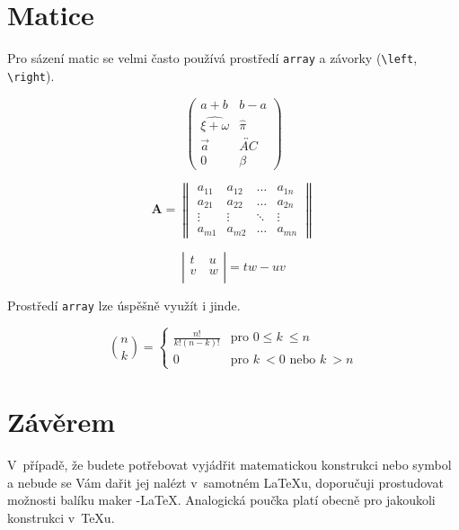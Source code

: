 \documentclass[a4paper, 11pt, twocolumn] {article}
\begin{document}
\section{Matice}

Pro sázení matic se velmi často používá prostředí \texttt{array} a závorky (\verb|\left|, \verb|\right|). 

$$\left(
\begin{array}{ccc}
a + b & b - a \\
\widehat{\xi + \omega} & \hat{\pi}\\
\vec{a}  & \overleftrightarrow{AC}\\
0 & \beta
\end{array}
\right)
$$

$$
\mathbf{A} = 
\left\|
\begin{array}{cccc}
a_{11} & a_{12} & \dots & a_{1n}\\
a_{21} & a_{22} & \dots & a_{2n}\\
\vdots & \vdots & \ddots & \vdots\\
a_{m1} & a_{m2} & \dots & a_{mn}
\end{array}
\right\|
$$

$$
\left|
\begin{array}{lcr}
t & u\\
v~& w\\
\end{array}
\right|
= tw -uv
$$

Prostředí \texttt{array} lze úspěšně využít i jinde.

$$
\binom{n}{k} =
\left\{
\begin{array}{ll}
\frac{n!}{k!(n - k)!} & \text{pro } 0 \leq k~\leq n\\
0 & \text{pro } k~< 0 \text{ nebo } k~> n
\end{array} \right.
$$

\section{Závěrem}

V~případě, že budete potřebovat vyjádřit matematickou konstrukci nebo symbol a nebude se Vám dařit jej nalézt v~samotném \LaTeX u, doporučuji prostudovat možnosti balíku maker \AmS -\LaTeX.
Analogická poučka platí obecně pro jakoukoli konstrukci v~\TeX u.
\end{document}
